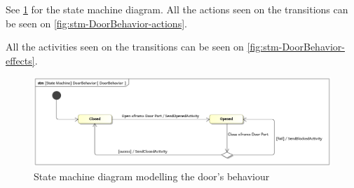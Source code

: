 \documentclass[a4paper]{article}
\begin{document}
See \cref{fig:stm-DoorBehavior} for the state machine diagram. All the actions
seen on the transitions can be seen on \cref{fig:stm-DoorBehavior-actions}.

All the activities seen on the transitions can be seen on
\cref{fig:stm-DoorBehavior-effects}.

\begin{figure}[p]
	\includegraphics[width=\textwidth]{stm-DoorBehavior.jpg}
	\caption{State machine diagram modelling the door's behaviour}%
	\label{fig:stm-DoorBehavior}
\end{figure}
\end{document}
